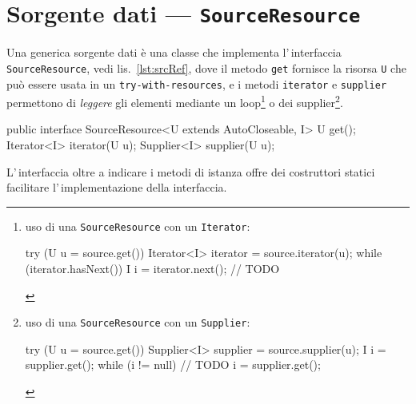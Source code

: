 \section{Sorgente dati --- \texttt{SourceResource}} \label{sec:srcRes}
Una generica sorgente dati è una classe che implementa l'\,interfaccia
\texttt{SourceResource}, vedi lis.~\ref{lst:srcRef}, dove il metodo \texttt{get}
fornisce la risorsa \texttt{U} che può essere usata in un
\texttt{try-with-resources}, e i metodi \texttt{iterator} e \texttt{supplier}
permettono di \textsl{leggere} gli elementi mediante un loop\footnote{%
    uso di una \texttt{SourceResource} con un \texttt{Iterator}:
    \begin{javacode}
        try (U u = source.get()) {
        Iterator<I> iterator = source.iterator(u);
        while (iterator.hasNext()) {
            I i = iterator.next();
            // TODO
        }
    }
    \end{javacode}
} o dei supplier\footnote{%
    uso di una \texttt{SourceResource} con un \texttt{Supplier}:
    \begin{javacode}
        try (U u = source.get()) {
        Supplier<I> supplier = source.supplier(u);
        I i = supplier.get();
        while (i != null) {
            // TODO
            i = supplier.get();
        }
    }
    \end{javacode}
}.

\begin{elisting}[!htb]
\begin{javacode}
public interface SourceResource<U extends AutoCloseable, I> {
    U get();
    Iterator<I> iterator(U u);
    Supplier<I> supplier(U u);
}
\end{javacode}
\caption{Metodi per aprire la risorsa e leggere i dati}
\label{lst:srcRef}
\end{elisting}

L'\,interfaccia oltre a indicare i metodi di istanza offre dei costruttori
statici facilitare l'\,implementazione della interfaccia.

